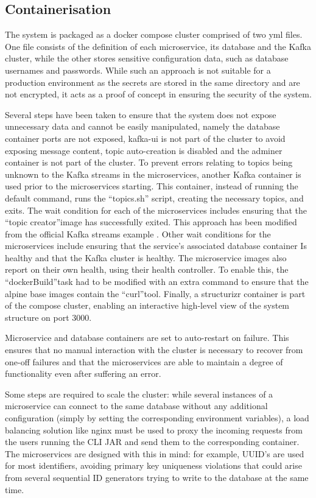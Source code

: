 \documentclass[parskip=full]{article}
\begin{document}
    \pagebreak
    \subsection{Containerisation}
    The system is packaged as a docker compose cluster comprised of two yml files.
    One file consists of the definition of each microservice, its database and the Kafka cluster, while the other stores sensitive configuration data, such as database usernames and passwords.
    While such an approach is not suitable for a production environment as the secrets are stored in the same directory and are not encrypted, it acts as a proof of concept in ensuring the security of the system.

    Several steps have been taken to ensure that the system does not expose unnecessary data and cannot be easily manipulated, namely the database container ports are not exposed, kafka-ui is not part of the cluster to avoid exposing message content, topic auto-creation is disabled and the adminer container is not part of the cluster.
    To prevent errors relating to topics being unknown to the Kafka streams in the microservices, another Kafka container is used prior to the microservices starting.
    This container, instead of running the default command, runs the ``topics.sh'' script, creating the necessary topics, and exits.
    The wait condition for each of the microservices includes ensuring that the ``topic creator''image has successfully exited.
    This approach has been modified from the official Kafka streams example \cite{kafkaStreamsExample}.
    Other wait conditions for the microservices include ensuring that the service's associated database container Is healthy and that the Kafka cluster is healthy.
    The microservice images also report on their own health, using their health controller.
    To enable this, the ``dockerBuild''task had to be modified with an extra command to ensure that the alpine base images contain the ``curl''tool.
    Finally, a structurizr container is part of the compose cluster, enabling an interactive high-level view of the system structure on port 3000.

    Microservice and database containers are set to auto-restart on failure.
    This ensures that no manual interaction with the cluster is necessary to recover from one-off failures and that the microservices are able to maintain a degree of functionality even after suffering an error.

    Some steps are required to scale the cluster: while several instances of a microservice can connect to the same database without any additional configuration (simply by setting the corresponding environment variables), a load balancing solution like nginx \cite{nginxProxyPass} must be used to proxy the incoming requests from the users running the CLI JAR and send them to the corresponding container.
    The microservices are designed with this in mind: for example, UUID's are used for most identifiers, avoiding primary key uniqueness violations that could arise from several sequential ID generators trying to write to the database at the same time.
\end{document}
